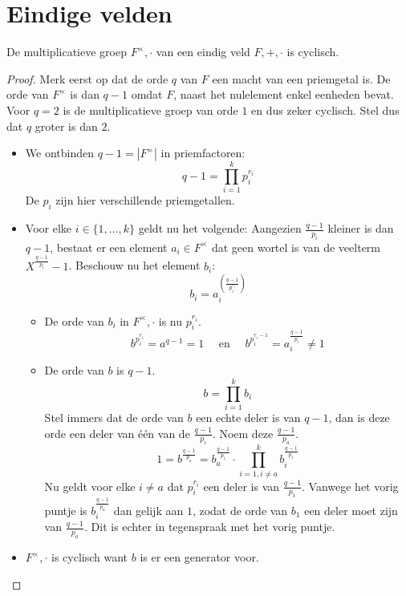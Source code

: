 \documentclass[main.tex]{subfiles}
\begin{document}
\section{Eindige velden}
\label{sec:eindige-velden}

\begin{st}
  \label{st:multiplicatieve-groep-van-veld-is-cyclisch}
  De multiplicatieve groep $F^{\times},\cdot$ van een eindig veld $F,+,\cdot$ is cyclisch.
  
  \begin{proof}
    Merk eerst op dat de orde $q$ van $F$ een macht van een priemgetal is.
    De orde van $F^{\times}$ is dan $q-1$ omdat $F$, naast het nulelement enkel eenheden bevat.
    Voor $q=2$ is de multiplicatieve groep van orde $1$ en dus zeker cyclisch.
    Stel dus dat $q$ groter is dan $2$.
    \begin{itemize}
    \item We ontbinden $q-1 = |F^{\times}|$ in priemfactoren:
      \[ q-1 = \prod_{i=1}^{k}p_{i}^{r_{i}}\]
      De $p_{i}$ zijn hier verschillende priemgetallen.
    \item Voor elke $i\in \{1,\dotsc,k\}$ geldt nu het volgende:
      Aangezien $\frac{q-1}{p_{i}}$ kleiner is dan $q-1$, bestaat er een element $a_{i}\in F^{\times}$ dat geen wortel is van de veelterm $X^{\frac{q-1}{p_{i}}}-1$. \waarom
      Beschouw nu het element $b_{i}$:
      \[ b_{i} = a_{i}^{\left(\frac{q-1}{p_{i}^{r_{i}}}\right)}\]
      \begin{itemize}
      \item De orde van $b_{i}$ in $F^{\times},\cdot$ is nu $p_{i}^{r_{i}}$.
        \[ b^{p_{i}^{r_{i}}} = a^{q-1} = 1 \quad\text{ en }\quad b^{p_{i}^{r_{i}-1}} = a_{i}^{\frac{q-1}{p_{i}}} \neq 1 \]
      \item De orde van $b$ is $q-1$.
        \[ b = \prod_{i=1}^{k}b_{i}\]
        Stel immers dat de orde van $b$ een echte deler is van $q-1$, dan is deze orde een deler van \'e\'en van de $\frac{q-1}{p_{i}}$.
        Noem deze $\frac{q-1}{p_{a}}$.
        \[ 1 = b^{\frac{q-1}{p_{a}}} = b_{a}^{\frac{q-1}{p_{1}}} \cdot \prod_{i=1, i\neq a}^{k}b_{i}^{\frac{q-1}{p_{1}}} \]
        Nu geldt voor elke $i\neq a$ dat $p_{i}^{r_{i}}$ een deler is van $\frac{q-1}{p_{1}}$.
        Vanwege het vorig puntje is $b_{i}^{\frac{q-1}{p_{a}}}$ dan gelijk aan $1$, zodat de orde van $b_{1}$ een deler moet zijn van $\frac{q-1}{p_{a}}$.
        Dit is echter in tegenspraak met het vorig puntje.
      \end{itemize}
    \item $F^{\times},\cdot$ is cyclisch want $b$ is er een generator voor.
    \end{itemize}
  \end{proof}
\end{st}
\end{document}

